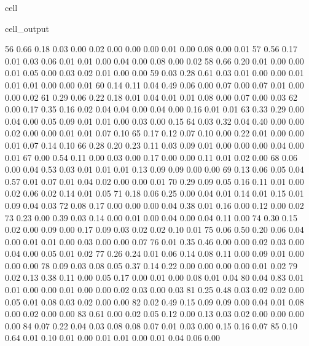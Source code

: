 \documentclass[letterpaper,10pt,french]{sphinxmanual}
\begin{document}
\begin{sphinxuseclass}{cell}
\begin{sphinxuseclass}{cell_output}
\begin{sphinxVerbatim}[commandchars=\\\{\}]
        56	0.66 	0.18 	0.03 	0.00 	0.02 	0.00 	0.00 	0.00 	0.01 	0.00 	0.08 	0.00 	0.01
        57	0.56 	0.17 	0.01 	0.03 	0.06 	0.01 	0.01 	0.00 	0.04 	0.00 	0.08 	0.00 	0.02
        58	0.66 	0.20 	0.01 	0.00 	0.00 	0.01 	0.05 	0.00 	0.03 	0.02 	0.01 	0.00 	0.00
        59	0.03 	0.28 	0.61 	0.03 	0.01 	0.00 	0.00 	0.01 	0.01 	0.01 	0.00 	0.00 	0.01
        60	0.14 	0.11 	0.04 	0.49 	0.06 	0.00 	0.07 	0.00 	0.07 	0.01 	0.00 	0.00 	0.02
        61	0.29 	0.06 	0.22 	0.18 	0.01 	0.04 	0.01 	0.01 	0.08 	0.00 	0.07 	0.00 	0.03
        62	0.00 	0.17 	0.35 	0.16 	0.02 	0.04 	0.04 	0.00 	0.04 	0.00 	0.16 	0.01 	0.01
        63	0.33 	0.29 	0.00 	0.04 	0.00 	0.05 	0.09 	0.01 	0.01 	0.00 	0.03 	0.00 	0.15
        64	0.03 	0.32 	0.04 	0.40 	0.00 	0.00 	0.02 	0.00 	0.00 	0.01 	0.01 	0.07 	0.10
        65	0.17 	0.12 	0.07 	0.10 	0.00 	0.22 	0.01 	0.00 	0.00 	0.01 	0.07 	0.14 	0.10
        66	0.28 	0.20 	0.23 	0.11 	0.03 	0.09 	0.01 	0.00 	0.00 	0.00 	0.04 	0.00 	0.01
        67	0.00 	0.54 	0.11 	0.00 	0.03 	0.00 	0.17 	0.00 	0.00 	0.11 	0.01 	0.02 	0.00
        68	0.06 	0.00 	0.04 	0.53 	0.03 	0.01 	0.01 	0.01 	0.13 	0.09 	0.09 	0.00 	0.00
        69	0.13 	0.06 	0.05 	0.04 	0.57 	0.01 	0.07 	0.01 	0.04 	0.02 	0.00 	0.00 	0.01
        70	0.29 	0.09 	0.05 	0.16 	0.11 	0.01 	0.00 	0.02 	0.06 	0.02 	0.14 	0.01 	0.05
        71	0.18 	0.06 	0.25 	0.00 	0.04 	0.01 	0.14 	0.01 	0.15 	0.01 	0.09 	0.04 	0.03
        72	0.08 	0.17 	0.00 	0.00 	0.00 	0.04 	0.38 	0.01 	0.16 	0.00 	0.12 	0.00 	0.02
        73	0.23 	0.00 	0.39 	0.03 	0.14 	0.00 	0.01 	0.00 	0.04 	0.00 	0.04 	0.11 	0.00
        74	0.30 	0.15 	0.02 	0.00 	0.09 	0.00 	0.17 	0.09 	0.03 	0.02 	0.02 	0.10 	0.01
        75	0.06 	0.50 	0.20 	0.06 	0.04 	0.00 	0.01 	0.01 	0.00 	0.03 	0.00 	0.00 	0.07
        76	0.01 	0.35 	0.46 	0.00 	0.00 	0.02 	0.03 	0.00 	0.04 	0.00 	0.05 	0.01 	0.02
        77	0.26 	0.24 	0.01 	0.06 	0.14 	0.08 	0.11 	0.00 	0.09 	0.01 	0.00 	0.00 	0.00
        78	0.09 	0.03 	0.08 	0.05 	0.37 	0.14 	0.22 	0.00 	0.00 	0.00 	0.00 	0.01 	0.02
        79	0.02 	0.13 	0.38 	0.11 	0.00 	0.05 	0.17 	0.00 	0.01 	0.00 	0.08 	0.01 	0.04
        80	0.04 	0.83 	0.01 	0.01 	0.00 	0.00 	0.01 	0.00 	0.00 	0.02 	0.03 	0.00 	0.03
        81	0.25 	0.48 	0.03 	0.02 	0.02 	0.00 	0.05 	0.01 	0.08 	0.03 	0.02 	0.00 	0.00
        82	0.02 	0.49 	0.15 	0.09 	0.09 	0.00 	0.04 	0.01 	0.08 	0.00 	0.02 	0.00 	0.00
        83	0.61 	0.00 	0.02 	0.05 	0.12 	0.00 	0.13 	0.03 	0.02 	0.00 	0.00 	0.00 	0.00
        84	0.07 	0.22 	0.04 	0.03 	0.08 	0.08 	0.07 	0.01 	0.03 	0.00 	0.15 	0.16 	0.07
        85	0.10 	0.64 	0.01 	0.10 	0.01 	0.00 	0.01 	0.01 	0.00 	0.01 	0.04 	0.06 	0.00

\end{sphinxVerbatim}
\end{sphinxuseclass}
\end{sphinxuseclass}
\end{document}
